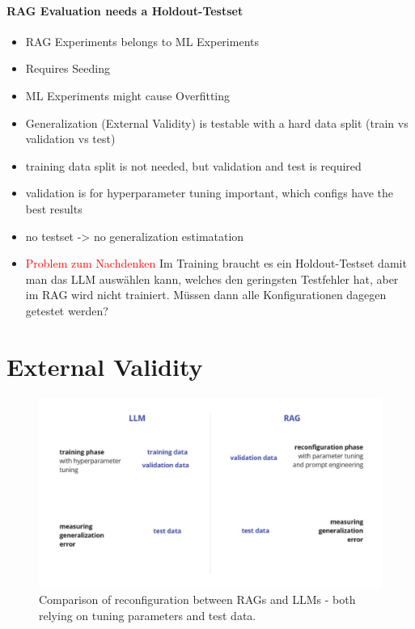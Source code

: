 \paragraph{RAG Evaluation needs a Holdout-Testset}
\begin{itemize}
    \item RAG Experiments belongs to ML Experiments 
    \item Requires Seeding
    \item ML Experiments might cause Overfitting
    \item Generalization (External Validity) is testable with a hard data split (train vs validation vs test)
    \item training data split is not needed, but validation and test is required
    \item validation is for hyperparameter tuning important, which configs have the best results
    \item no testset -> no generalization estimatation
    \item \textcolor{red}{Problem zum Nachdenken} Im Training braucht es ein Holdout-Testset damit man das LLM auswählen kann, welches den geringsten Testfehler hat, aber im RAG wird nicht trainiert. Müssen dann alle Konfigurationen dagegen getestet werden?
\end{itemize}

\section{External Validity}

\begin{figure}
    \centering
    \includegraphics[width=\textwidth]{images/RAGvsLLM-tuning.pdf}
    \caption{Comparison of reconfiguration between RAGs and LLMs - both relying on tuning parameters and test data.}
    \label{fig:tuning}
\end{figure}

